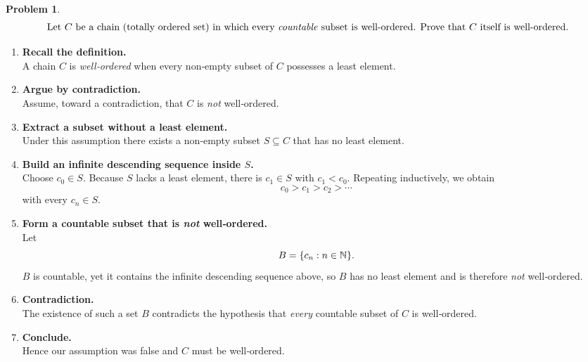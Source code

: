 \documentclass[12pt]{article}
\theoremstyle{definition} %
\newtheorem{problem}{Problem}
\theoremstyle{plain} %
\begin{document}
\begin{problem}
    \begin{align}
        \text{Let $C$ be a chain (totally ordered set) in which every \emph{countable}
        subset is well‑ordered.  Prove that $C$ itself is well‑ordered.}
    \end{align}

    \begin{enumerate}
        \item \textbf{Recall the definition.}\\
              A chain $C$ is \emph{well‑ordered} when every non‑empty
              subset of $C$ possesses a least element.

        \item \textbf{Argue by contradiction.}\\
              Assume, toward a contradiction, that $C$ is \emph{not}
              well‑ordered.

        \item \textbf{Extract a subset without a least element.}\\
              Under this assumption there exists a non‑empty subset
              $S\subseteq C$ that has no least element.

        \item \textbf{Build an infinite descending sequence inside $S$.}\\
              Choose $c_{0}\in S$.  
              Because $S$ lacks a least element, there is
              $c_{1}\in S$ with $c_{1}<c_{0}$.
              Repeating inductively, we obtain
              \[
                  c_{0}>c_{1}>c_{2}>\dotsb
              \]
              with every $c_{n}\in S$.

        \item \textbf{Form a countable subset that is \emph{not} well‑ordered.}\\
              Let
              \[
                  B=\{c_{n}:n\in\Bbb N\}.
              \]
              $B$ is countable, yet it contains the infinite
              descending sequence above, so $B$ has no least element and is
              therefore \emph{not} well‑ordered.

        \item \textbf{Contradiction.}\\
              The existence of such a set $B$ contradicts the hypothesis that
              \emph{every} countable subset of $C$ is well‑ordered.

        \item \textbf{Conclude.}\\
              Hence our assumption was false and $C$ must be well‑ordered.
              \qedhere
    \end{enumerate}
\end{problem}
\end{document}
